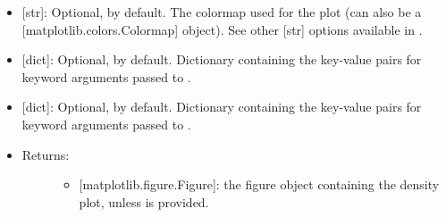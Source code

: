 \documentclass[letterpaper,10pt,english]{sphinxmanual}
\begin{document}
\begin{fulllineitems}
\begin{itemize}
\begin{description}
\begin{itemize}
\item {} 
 {[}str{]}: Optional,  by default. The colormap
used for the plot (can also be a {[}matplotlib.colors.Colormap{]}
object). See other {[}str{]} options available in .

\item {} 
 {[}dict{]}: Optional, \sphinxcode{\sphinxupquote{\{\}}} by default. Dictionary
containing the key-value pairs for keyword arguments passed to
.

\item {} 
 {[}dict{]}: Optional, \sphinxcode{\sphinxupquote{\{\}}} by default. Dictionary
containing the key-value pairs for keyword arguments passed to
.

\end{itemize}

\end{description}

\end{itemize}
\begin{itemize}
\item {} \begin{description}
\item[{Returns:}] \leavevmode\begin{itemize}
\item {} 
{[}matplotlib.figure.Figure{]}: the figure object containing the
density plot, unless  is provided.

\end{itemize}

\end{description}

\end{itemize}

\end{fulllineitems}

\end{document}
